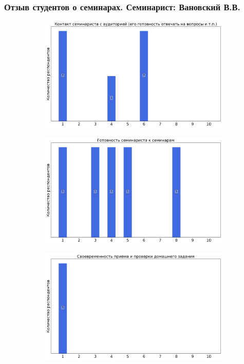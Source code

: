 	\subsubsection{Отзыв студентов о семинарах. Семинарист: Вановский В.В.}
		\begin{figure}[H]
			\centering
			\begin{subfigure}[b]{0.45\textwidth}
				\centering
				\includegraphics[width=\textwidth]{images/1 course/Общая физика - механика/seminarists-marks-Вановский В.В.-0.png}
			\end{subfigure}
			\begin{subfigure}[b]{0.45\textwidth}
				\centering
				\includegraphics[width=\textwidth]{images/1 course/Общая физика - механика/seminarists-marks-Вановский В.В.-1.png}
			\end{subfigure}
			\begin{subfigure}[b]{0.45\textwidth}
				\centering
				\includegraphics[width=\textwidth]{images/1 course/Общая физика - механика/seminarists-marks-Вановский В.В.-2.png}

\end{subfigure}
\end{figure}
